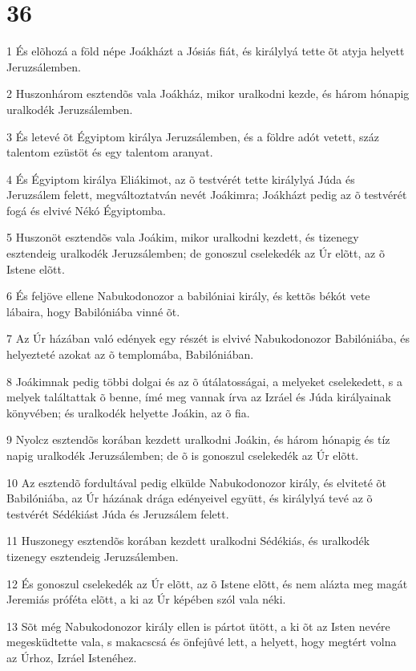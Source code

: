 \chapter{36}

\par 1 És elõhozá a föld népe Joákházt a Jósiás fiát, és királylyá tette õt atyja helyett Jeruzsálemben.
\par 2 Huszonhárom esztendõs vala Joákház, mikor uralkodni kezde, és három hónapig uralkodék Jeruzsálemben.
\par 3 És letevé õt Égyiptom királya Jeruzsálemben, és a földre adót vetett, száz talentom ezüstöt és egy talentom aranyat.
\par 4 És Égyiptom királya Eliákimot, az õ testvérét tette királylyá Júda és Jeruzsálem felett, megváltoztatván nevét Joákimra; Joákházt pedig az õ testvérét fogá és elvivé Nékó Égyiptomba.
\par 5 Huszonöt esztendõs vala Joákim, mikor uralkodni kezdett, és tizenegy esztendeig uralkodék Jeruzsálemben; de gonoszul cselekedék az Úr elõtt, az õ Istene elõtt.
\par 6 És feljöve ellene Nabukodonozor a babilóniai király, és kettõs békót vete lábaira, hogy Babilóniába vinné õt.
\par 7 Az Úr házában való edények egy részét is elvivé Nabukodonozor Babilóniába, és helyezteté azokat az õ templomába, Babilóniában.
\par 8 Joákimnak pedig többi dolgai és az õ útálatosságai, a melyeket cselekedett, s a melyek találtattak õ benne, ímé meg vannak írva az Izráel és Júda királyainak könyvében; és uralkodék helyette Joákin, az õ fia.
\par 9 Nyolcz esztendõs korában kezdett uralkodni Joákin, és három hónapig és tíz napig uralkodék Jeruzsálemben; de õ is gonoszul cselekedék az Úr elõtt.
\par 10 Az esztendõ fordultával pedig elkülde Nabukodonozor király, és elviteté õt Babilóniába, az Úr házának drága edényeivel együtt, és királylyá tevé az õ testvérét Sédékiást Júda és Jeruzsálem felett.
\par 11 Huszonegy esztendõs korában kezdett uralkodni Sédékiás, és uralkodék tizenegy esztendeig Jeruzsálemben.
\par 12 És gonoszul cselekedék az Úr elõtt, az õ Istene elõtt, és nem alázta meg magát Jeremiás próféta elõtt, a ki az Úr képében szól vala néki.
\par 13 Sõt még Nabukodonozor király ellen is pártot ütött, a ki õt az Isten nevére megesküdtette vala, s makacscsá és önfejûvé lett, a helyett, hogy megtért volna az Úrhoz, Izráel Istenéhez.
